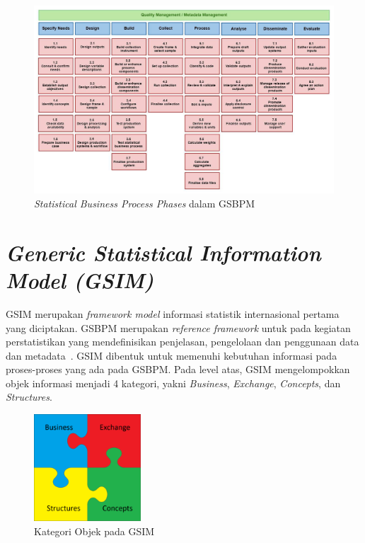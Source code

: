 \begin{figure}
    \centering
    \includegraphics[width=1\textwidth]{../../Resources/Images/gsbpm}
    \caption{\textit{Statistical Business Process Phases} dalam GSBPM}
    \label{fig:gsbpm2}
\end{figure}

\section{\textit{Generic Statistical Information Model (GSIM)}}
GSIM merupakan \textit{framework model} informasi statistik internasional pertama yang diciptakan. GSBPM merupakan \textit{reference framework} untuk  pada kegiatan perstatistikan yang mendefinisikan penjelasan, pengelolaan dan penggunaan data dan metadata~\cite{_gsim_????}. GSIM dibentuk untuk memenuhi kebutuhan informasi pada proses-proses yang ada pada GSBPM. Pada level atas, GSIM mengelompokkan objek informasi menjadi 4 kategori, yakni \textit{Business}, \textit{Exchange}, \textit{Concepts}, dan \textit{Structures}.

\begin{figure}[h]
    \centering
    \includegraphics[height=4cm]{../../Resources/Images/gsim}
    \caption{Kategori Objek pada GSIM}
    \label{fig:gsim}
\end{figure}

